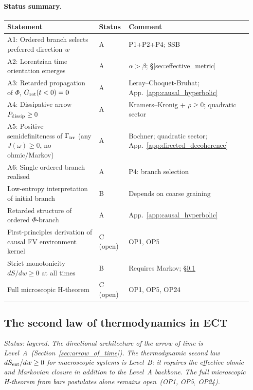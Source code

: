 \documentclass[11pt,a4paper]{article}
\numberwithin{equation}{section}
\begin{document}
\paragraph{Status summary.}
\begin{center}
\renewcommand{\arraystretch}{1.2}
\begin{tabular}{p{6.0cm}p{2.0cm}p{5.0cm}}
\hline
Statement & Status & Comment \\
\hline
A1: Ordered branch selects preferred direction $w$
  & A & P1+P2+P4; SSB \\
A2: Lorentzian time orientation emerges
  & A & $\alpha>\beta$; \S\ref{sec:effective_metric} \\
A3: Retarded propagation of $\Phi$, $G_{\rm ret}(t<0)=0$
  & A & Leray--Choquet-Bruhat;
    App.~\ref{app:causal_hyperbolic} \\
A4: Dissipative arrow $P_{\rm dissip}\geq 0$
  & A & Kramers--Kronig + $\rho\geq 0$;
    quadratic sector \\
A5: Positive semidefiniteness of $\Gamma_{\rm irr}$
  (any $J(\omega)\geq 0$, no ohmic/Markov)
  & A & Bochner; quadratic sector;
    App.~\ref{app:directed_decoherence} \\
A6: Single ordered branch realised
  & A & P4: branch selection \\
Low-entropy interpretation of initial branch
  & B & Depends on coarse graining \\
Retarded structure of ordered $\Phi$-branch
  & A & App.~\ref{app:causal_hyperbolic} \\
First-principles derivation of causal FV
  environment kernel
  & C (open) & OP1, OP5 \\
Strict monotonicity $dS/dw\geq 0$ at all times
  & B & Requires Markov;
    \S\ref{sec:second_law_basics} \\
Full microscopic H-theorem
  & C (open) & OP1, OP5, OP24 \\
\hline
\end{tabular}
\end{center}


\subsection{The second law of thermodynamics in ECT}
\label{sec:second_law_basics}

\textit{Status: layered.
The directional architecture of the arrow of time is
Level~A~(Section~\ref{sec:arrow_of_time}).
The thermodynamic second law $dS_{\rm ent}/dw\geq 0$ for
macroscopic systems is Level~B: it requires the effective
ohmic and Markovian closure in addition to the Level~A backbone.
The full microscopic H-theorem from bare postulates alone remains
open~(OP1, OP5, OP24).}
\end{document}
